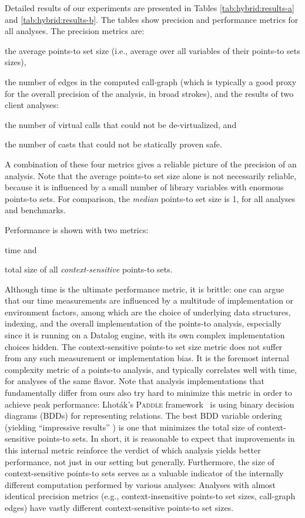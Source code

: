 Detailed results of our experiments are presented in Tables \ref{tab:hybrid:results-a} and \ref{tab:hybrid:results-b}. The tables show precision and performance metrics for all analyses. The precision metrics are:
\begin{inparaenum}[(1)]
\item the average points-to set size (i.e., average over all variables of their
points-to sets sizes),
\item the number of edges in the computed call-graph (which is typically a good proxy for the overall precision of the analysis, in broad strokes), and
the results of two client analyses:
\item the number of virtual calls that could not be de-virtualized, and
\item the number of casts that could not be statically proven safe.
\end{inparaenum}
A combination of these four metrics gives a reliable picture of the precision of an analysis. Note that the average points-to set size alone is not necessarily reliable, because it is influenced by a small number of library variables with enormous points-to sets. For comparison, the \emph{median} points-to set size is 1, for all analyses and benchmarks.

Performance is shown with two metrics:
\begin{inparaenum}[(1)]
\item time and
\item total size of all \emph{context-sensitive} points-to sets.
\end{inparaenum}
Although time is the ultimate performance metric, it is brittle: one can argue that our time measurements are influenced by a multitude of implementation or environment factors, among which are the choice of underlying data structures, indexing, and the overall implementation of the points-to analysis, especially since it is running on a Datalog engine, with its own complex implementation choices hidden. The context-sensitive points-to set size metric does not suffer from any such measurement or implementation bias. It is the foremost internal complexity metric of a points-to analysis, and typically correlates well with time, for analyses of the same flavor. Note that analysis implementations that fundamentally differ from ours also try hard to minimize this metric in order to achieve peak performance: Lhot\'{a}k's \textsc{Paddle} framework~\cite{thesis:Lhotak} is using binary decision diagrams (BDDs) for representing relations. The best BDD variable ordering (yielding ``impressive results'' \cite{pldi:2003:Berndl}) is one that minimizes the total size of context-sensitive points-to sets. In short, it is reasonable to expect that improvements in this internal metric reinforce the verdict of which analysis yields better performance, not just in our setting but generally. Furthermore, the size of context-sensitive points-to sets serves as a valuable indicator of the internally different computation performed by various analyses: Analyses with almost identical precision metrics (e.g., context-insensitive points-to set sizes, call-graph edges) have vastly different context-sensitive points-to set sizes.


